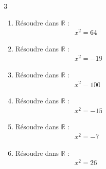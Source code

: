 {%
\begin{Exercice}%
\leavevmode\vspace{-\baselineskip}

\begin{multicols}{3}
\begin{enumerate}[itemsep=1em]
	\item \begin{minipage}[t]{\linewidth}Résoudre dans $\mathbb{R}$ :\\
              \,\,\,\,\,\,\,\,\,\,\,\,\,\,\,\,\,\,\,\,\,\,\,\,\,\,\,\,\,\,\,\,\,\,\,\,\,\,\,\,\,\,\,\,\,\,\,\,\,\, $x^2=64$\\\end{minipage}
	\item \begin{minipage}[t]{\linewidth}Résoudre dans $\mathbb{R}$ :\\
              \,\,\,\,\,\,\,\,\,\,\,\,\,\,\,\,\,\,\,\,\,\,\,\,\,\,\,\,\,\,\,\,\,\,\,\,\,\,\,\,\,\,\,\,\,\,\,\,\,\, $x^2=-19$\\\end{minipage}
	\item \begin{minipage}[t]{\linewidth}Résoudre dans $\mathbb{R}$ :\\
              \,\,\,\,\,\,\,\,\,\,\,\,\,\,\,\,\,\,\,\,\,\,\,\,\,\,\,\,\,\,\,\,\,\,\,\,\,\,\,\,\,\,\,\,\,\,\,\,\,\, $x^2=100$\\\end{minipage}
	\item \begin{minipage}[t]{\linewidth}Résoudre dans $\mathbb{R}$ :\\
              \,\,\,\,\,\,\,\,\,\,\,\,\,\,\,\,\,\,\,\,\,\,\,\,\,\,\,\,\,\,\,\,\,\,\,\,\,\,\,\,\,\,\,\,\,\,\,\,\,\, $x^2=-15$\\\end{minipage}
	\item \begin{minipage}[t]{\linewidth}Résoudre dans $\mathbb{R}$ :\\
              \,\,\,\,\,\,\,\,\,\,\,\,\,\,\,\,\,\,\,\,\,\,\,\,\,\,\,\,\,\,\,\,\,\,\,\,\,\,\,\,\,\,\,\,\,\,\,\,\,\, $x^2=-7$\\\end{minipage}
	\item \begin{minipage}[t]{\linewidth}Résoudre dans $\mathbb{R}$ :\\
              \,\,\,\,\,\,\,\,\,\,\,\,\,\,\,\,\,\,\,\,\,\,\,\,\,\,\,\,\,\,\,\,\,\,\,\,\,\,\,\,\,\,\,\,\,\,\,\,\,\, $x^2=26$\\\end{minipage}
\end{enumerate}
\end{multicols}
\end{Exercice}

}
